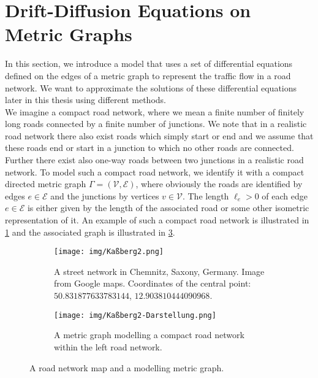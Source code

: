 \section{Drift-Diffusion Equations on Metric Graphs}
\label{ch1:sec2}

In this section, we introduce a model that uses a set of differential equations defined on the edges of a metric graph to represent the traffic flow in a road network. We want to approximate the solutions of these differential equations later in this thesis using different methods.  \\
We imagine a compact road network, where we mean a finite number of finitely long roads connected by a finite number of junctions. We note that in a realistic road network there also exist roads which simply start or end and we assume that these roads end or start in a junction to which no other roads are connected. Further there exist also one-way roads between two junctions in a realistic road network. To model such a compact road network, we identify it with a compact directed metric graph $\Gamma =  \left( \mathcal{V}, \mathcal{E} \right) $, where obviously the roads are identified by edges $e \in \mathcal{E}$ and the junctions by vertices $v \in \mathcal{V}$. The length $\ell_e > 0$ of each edge $e \in \mathcal{E}$ is either given by the length of the associated road or some other isometric representation of it. An example of such a compact road network is illustrated in \cref{fig8:f1} and the associated graph is illustrated in \cref{fig8:f2}. \\

\begin{figure}[H]
    \begin{center}
        \begin{subfigure}[b]{0.4\textwidth}
            \begin{center}
                \texttt{[image: img/Kaßberg2.png]}
            \end{center}
            \caption{A street network in Chemnitz, Saxony, Germany. Image from Google maps. Coordinates of the central point: $50.831877633783144$, $12.903810444090968$.}
            \label{fig8:f1}
        \end{subfigure}\hspace{15mm}
        \begin{subfigure}[b]{0.4\textwidth}
            \begin{center}
                \texttt{[image: img/Kaßberg2-Darstellung.png]}
            \end{center}
            \caption{A metric graph modelling a compact road network within the left road network.}
            \label{fig8:f2}
        \end{subfigure}
    \end{center}
    \caption{A road network map and a modelling metric graph.}
\end{figure}

